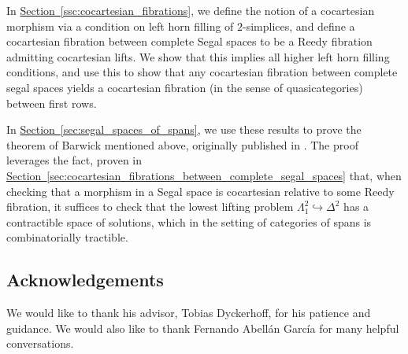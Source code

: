 \documentclass[main.tex]{subfiles}
\begin{document}
In \hyperref[ssc:cocartesian_fibrations]{Section~\ref*{ssc:cocartesian_fibrations}}, we define the notion of a cocartesian morphism via a condition on left horn filling of $2$-simplices, and define a cocartesian fibration between complete Segal spaces to be a Reedy fibration admitting cocartesian lifts. We show that this implies all higher left horn filling conditions, and use this to show that any cocartesian fibration between complete segal spaces yields a cocartesian fibration (in the sense of quasicategories) between first rows.

In \hyperref[sec:segal_spaces_of_spans]{Section~\ref*{sec:segal_spaces_of_spans}}, we use these results to prove the theorem of Barwick mentioned above, originally published in \cite[Thm.~12.2]{spectralmackeyfunctors1}. The proof leverages the fact, proven in \hyperref[sec:cocartesian_fibrations_between_complete_segal_spaces]{Section~\ref*{sec:cocartesian_fibrations_between_complete_segal_spaces}} that, when checking that a morphism in a Segal space is cocartesian relative to some Reedy fibration, it suffices to check that the lowest lifting problem $\Lambda^{2}_{1} \hookrightarrow \Delta^{2}$ has a contractible space of solutions, which in the setting of categories of spans is combinatorially tractible.


\subsection{Acknowledgements}
\label{ssc:acknowledgements}

We would like to thank his advisor, Tobias Dyckerhoff, for his patience and guidance. We would also like to thank Fernando Abell{\'a}n Garc{\'i}a for many helpful conversations.
\end{document}
